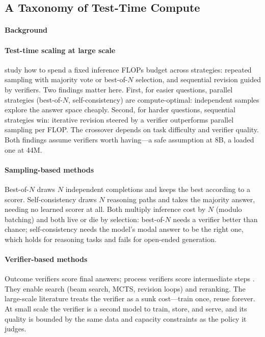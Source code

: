 \subsection{A Taxonomy of Test-Time Compute}
\label{ch-taxonomy}

\paragraph{Background}

\paragraph{Test-time scaling at large scale}

\citet{snell2024scaling} study how to spend a fixed inference FLOPs
budget across strategies: repeated sampling with majority vote or
best-of-$N$ selection, and sequential revision guided by verifiers. Two
findings matter here. First, for easier questions, parallel strategies
(best-of-$N$, self-consistency) are compute-optimal: independent samples
explore the answer space cheaply. Second, for harder questions,
sequential strategies win: iterative revision steered by a verifier
outperforms parallel sampling per FLOP. The crossover depends on task
difficulty and verifier quality. Both findings assume verifiers worth
having---a safe assumption at 8B, a loaded one at 44M.

\paragraph{Sampling-based methods}

Best-of-$N$ draws $N$ independent completions and keeps the best
according to a scorer. Self-consistency \citep{wang2023selfconsistency}
draws $N$ reasoning paths and takes the majority answer, needing no
learned scorer at all. Both multiply inference cost by $N$ (modulo
batching) and both live or die by selection: best-of-$N$ needs a
verifier better than chance; self-consistency needs the model's modal
answer to be the right one, which holds for reasoning tasks and fails
for open-ended generation.

\paragraph{Verifier-based methods}

Outcome verifiers score final answers; process verifiers score
intermediate steps \citep{cobbe2021verifiers}. They enable search
(beam search, MCTS, revision loops) and reranking. The large-scale
literature treats the verifier as a sunk cost---train once, reuse
forever. At small scale the verifier is a second model to train, store,
and serve, and its quality is bounded by the same data and capacity
constraints as the policy it judges.

